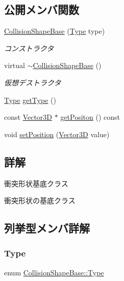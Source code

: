 \subsection*{公開メンバ関数}
\begin{DoxyCompactItemize}
\item 
\mbox{\hyperlink{class_collision_shape_base_a9dd2ab42e2a6e96c6bff832ce8ca62b9}{Collision\+Shape\+Base}} (\mbox{\hyperlink{class_collision_shape_base_a8abcef092855ad0ca191047044b002cb}{Type}} type)
\begin{DoxyCompactList}\small\item\em コンストラクタ \end{DoxyCompactList}\item 
virtual \mbox{\hyperlink{class_collision_shape_base_a64fa9e1ae6b582be42360e926ce5d6cb}{$\sim$\+Collision\+Shape\+Base}} ()
\begin{DoxyCompactList}\small\item\em 仮想デストラクタ \end{DoxyCompactList}\item 
\mbox{\hyperlink{class_collision_shape_base_a8abcef092855ad0ca191047044b002cb}{Type}} \mbox{\hyperlink{class_collision_shape_base_a662af47ebcd9f29d7c54047a0227b8bc}{get\+Type}} ()
\item 
const \mbox{\hyperlink{class_vector3_d}{Vector3D}} $\ast$ \mbox{\hyperlink{class_collision_shape_base_a17bd2d81ebf464459dd977152e02055b}{get\+Positon}} () const
\item 
void \mbox{\hyperlink{class_collision_shape_base_ac14132139e486926df11f438a8600907}{set\+Position}} (\mbox{\hyperlink{class_vector3_d}{Vector3D}} value)
\end{DoxyCompactItemize}


\subsection{詳解}
衝突形状基底クラス 

衝突形状の基底クラス 

\subsection{列挙型メンバ詳解}
\mbox{\label{class_collision_shape_base_a8abcef092855ad0ca191047044b002cb}} 
\subsubsection{\texorpdfstring{Type}{Type}}
{\footnotesize\ttfamily enum \mbox{\hyperlink{class_collision_shape_base_a8abcef092855ad0ca191047044b002cb}{Collision\+Shape\+Base\+::\+Type}}}

